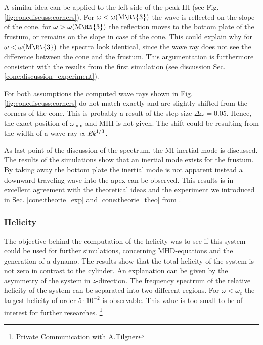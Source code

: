 A similar idea can be applied to the left side of the peak \RN{3} (see Fig. \ref{fig:conediscuss:corners}).
For $\omega<\omega(\text{M\RN{3}})$ the wave is reflected on the slope of the cone.
for  $\omega>\omega(\text{M\RN{3}})$ the reflection moves to the bottom plate of the frustum,
or remains on the slope in case of the cone.
This could explain why for   $\omega<\omega(\text{M\RN{3}})$  the spectra look identical,
since the wave ray does not see the difference between the cone and the frustum.
This argumentation is furthermore consistent with the results from the first simulation
(see discussion Sec. \ref{cone:discussion_experiment}).

For both assumptions the computed wave rays shown in Fig. \ref{fig:conediscuss:corners} do not match exactly and are slightly shifted from the corners of the cone.
This is probably a result of the step size $\Delta \omega = 0.05$. Hence, the exact position of $\omega_\text{min}$ and M\RN{3} is not given.
The shift could be resulting from the width of a wave ray $\propto \mbox{\textit{Ek}}^{1/3}$.


As last point of the discussion of the spectrum, the M\RN{1} inertial mode is discussed.
The results of the simulations show that an inertial mode exists for the frustum.
By taking away the bottom plate the inertial mode is not apparent instead
a downward traveling wave into the apex can be observed.
This results is in excellent agreement with the theoretical ideas and the experiment we introduced in Sec.
\ref{cone:theorie_exp} and \ref{cone:theorie_theo} from \citep{Beardsley1970, Greenspan1969}.

\subsubsection{Helicity}

The objective behind the computation of the helicity was to see if this system could be used
for further simulations, concerning MHD-equations and the generation of a dynamo.
The results show that the total helicity of the system is not zero in contrast to the cylinder.
An explanation can be given by the asymmetry of the system in $z$-direction.
The frequency spectrum of the relative helicity of the  system can be separated into two different regions.
For $\omega<\omega_c$ the largest helicity of order $5\cdot10^{-2}$ is observable.
This value is too small to be of interest for further researches.
\footnote{Private Communication with A.Tilgner}


